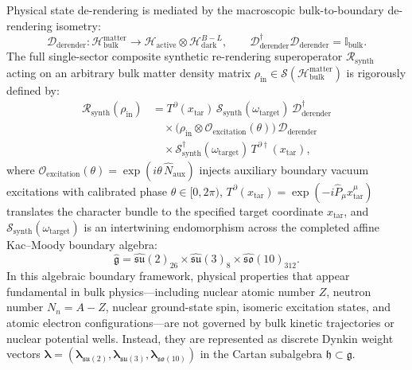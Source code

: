 \documentclass[11pt,onecolumn]{article}
\begin{document}
Physical state de-rendering is mediated by the macroscopic bulk-to-boundary de-rendering isometry:
\begin{equation}
\mathcal{D}_{\text{derender}} : \mathcal{H}_{\text{bulk}}^{\text{matter}} \longrightarrow \mathcal{H}_{\text{active}} \otimes \mathcal{H}_{\text{dark}}^{B-L}, \qquad \mathcal{D}_{\text{derender}}^\dagger \mathcal{D}_{\text{derender}} = \mathbb{I}_{\text{bulk}}.
\label{eq:d_derender}
\end{equation}
The full single-sector composite synthetic re-rendering superoperator $\mathcal{R}_{\text{synth}}$ acting on an arbitrary bulk matter density matrix $\rho_{\text{in}} \in \mathcal{S}(\mathcal{H}_{\text{bulk}}^{\text{matter}})$ is rigorously defined by:
\begin{equation}
\begin{split}
\mathcal{R}_{\text{synth}}(\rho_{\text{in}}) &= T^\partial(x_{\text{tar}})\,\mathcal{S}_{\text{synth}}(\omega_{\text{target}})\,\mathcal{D}_{\text{derender}}^\dagger \\
&\quad \times \bigl(\rho_{\text{in}} \otimes \mathcal{O}_{\text{excitation}}(\theta)\bigr)\,\mathcal{D}_{\text{derender}} \\
&\quad \times \mathcal{S}_{\text{synth}}^\dagger(\omega_{\text{target}})\,T^{\partial\dagger}(x_{\text{tar}}),
\end{split}
\label{eq:rsynth}
\end{equation}
where $\mathcal{O}_{\text{excitation}}(\theta) = \exp(i\theta\,\hat{N}_{\text{aux}})$ injects auxiliary boundary vacuum excitations with calibrated phase $\theta \in [0, 2\pi)$, $T^\partial(x_{\text{tar}}) = \exp(-i \hat{P}_\mu x_{\text{tar}}^\mu)$ translates the character bundle to the specified target coordinate $x_{\text{tar}}$, and $\mathcal{S}_{\text{synth}}(\omega_{\text{target}})$ is an intertwining endomorphism across the completed affine Kac--Moody boundary algebra:
\begin{equation}
\widehat{\mathfrak{g}} = \widehat{\mathfrak{su}}(2)_{26} \times \widehat{\mathfrak{su}}(3)_8 \times \widehat{\mathfrak{so}}(10)_{312}.
\label{eq:affine_algebra_synth}
\end{equation}
In this algebraic boundary framework, physical properties that appear fundamental in bulk physics---including nuclear atomic number $Z$, neutron number $N_n = A - Z$, nuclear ground-state spin, isomeric excitation states, and atomic electron configurations---are not governed by bulk kinetic trajectories or nuclear potential wells. Instead, they are represented as discrete Dynkin weight vectors $\bm{\lambda} = (\bm{\lambda}_{\mathfrak{su}(2)}, \bm{\lambda}_{\mathfrak{su}(3)}, \bm{\lambda}_{\mathfrak{so}(10)})$ in the Cartan subalgebra $\mathfrak{h} \subset \mathfrak{g}$.
\end{document}
